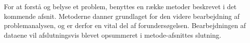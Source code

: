 For at forstå og belyse et problem, benyttes en række metoder beskrevet i det kommende afsnit. Metoderne danner grundlaget for den videre bearbejdning af problemanalysen, og er derfor en vital del af forundersøgelsen. Bearbejdningen af dataene vil afslutningsvis blevet opsummeret i metode-afsnittes slutning.